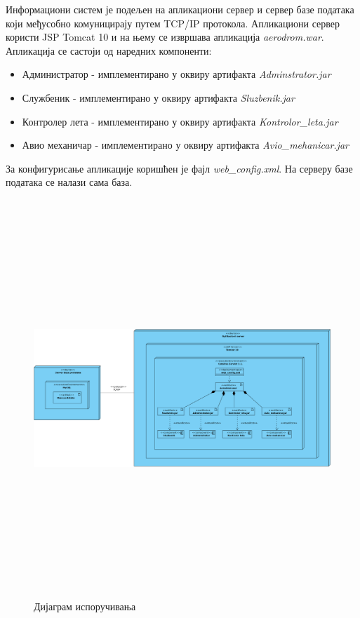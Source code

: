 \documentclass{article}
\begin{document}
Информациони систем је подељен на апликациони сервер и сервер базе података који међусобно комуницирају путем TCP/IP протокола. Апликациони сервер користи JSP Tomcat 10 и на њему се извршава апликација \textit{aerodrom.war}. Апликација се састоји од наредних компоненти:
    \begin{itemize}
        \item Администратор - имплементирано у оквиру артифакта \textit{Adminstrator.jar}
        \item Службеник - имплементирано у оквиру артифакта \textit{Sluzbenik.jar}
        \item Контролер лета - имплементирано у оквиру артифакта \textit{Kontrolor\_leta.jar}
        \item Авио механичар - имплементирано у оквиру артифакта \textit{Avio\_mehanicar.jar}
    \end{itemize}

За конфигурисање апликације коришћен је фајл \textit{web\_config.xml}. На серверу базе података се налази сама база.

\begin{figure}[H]
    \begin{center}
        \includegraphics[width=1.1\textwidth, height=15cm]{Dijagrami_slike/dijagram_isporucivanja.png}
        \caption{Дијаграм испоручивања}
    \end{center}
\end{figure}
\end{document}
